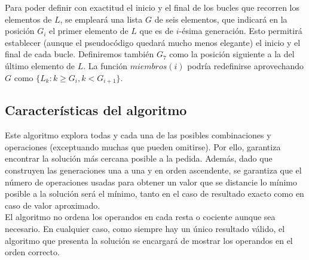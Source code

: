 \vspace{0.4cm}

Para poder definir con exactitud el inicio y el final de los bucles que recorren
los elementos de $L$, se empleará una lista $G$ de seis elementos, que indicará
en la posición $G_i$ el primer elemento de $L$ que es de $i$-ésima generación.
Esto permitirá establecer (aunque el pseudocódigo quedará mucho menos elegante)
el inicio y el final de cada bucle. Definiremos también $G_7$ como la posición
siguiente a la del último elemento de $L$. La función $miembros(i)$ podría
redefinirse aprovechando $G$ como $\{L_k : k \ge G_i, k < G_{i+1}\}$.


\subsection{Características del algoritmo}
Este algoritmo explora todas y cada una de las posibles combinaciones y operaciones
(exceptuando muchas que pueden omitirse). Por ello, garantiza encontrar la
solución más cercana posible a la pedida. Además, dado que construyen las
generaciones una a una y en orden ascendente, se garantiza que el número de
operaciones usadas para obtener un valor que se distancie lo mínimo posible
a la solución será el mínimo, tanto en el caso de resultado exacto como en
caso de valor aproximado.\\

El algoritmo no ordena los operandos en cada resta o cociente aunque sea necesario.
En cualquier caso, como siempre hay un único resultado válido, el algoritmo que
presenta la solución se encargará de mostrar los operandos en el orden correcto.
